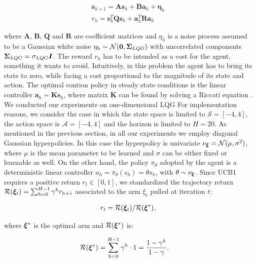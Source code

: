 \begin{align}
\boldsymbol{s}_{h+1}=\boldsymbol{A}\boldsymbol{s}_h+\boldsymbol{B}\boldsymbol{a}_h +\boldsymbol{\eta}_h\\
r_h=\boldsymbol{s}_{h}^T\boldsymbol{Q}\boldsymbol{s}_{h}+\boldsymbol{a}_{h}^T\boldsymbol{R}\boldsymbol{a}_{h}
\end{align}

where $\boldsymbol{A}$, $\boldsymbol{B}$, $\boldsymbol{Q}$ and $\boldsymbol{R}$ are coefficient matrices and $\eta_h$ is a noise process assumed to be a Gaussian white noise $\eta_h\sim\mathcal{N}(\boldsymbol{0}, \boldsymbol{\Sigma}_{LQG})$ with uncorrelated components $\boldsymbol{\Sigma}_{LQG}=\sigma_{LQG}\boldsymbol{I}$. The reward $r_h$ has to be intended as a cost for the agent, something it wants to avoid.
Intuitively, in this problem the agent has to bring its state to zero, while facing a cost proportional to the magnitude of its state and action. The optimal contion policy in steady state conditions is the linear controller $\boldsymbol{a}_{h}=\boldsymbol{K}\boldsymbol{s}_{h}$, where matrix $\boldsymbol{K}$ can be found by solving a Riccati equation \cite{dorato1995linear}. 
We conducted our experiments on one-dimensional \gls{LQG}
For implementation reasons, we consider the case in which the state space is limited to $\mathcal{S}=[-4,4]$, the action space is $\mathcal{A}=[-4,4]$ and the horizon is limited to $H=20$. As mentioned in the previous section, in all our experiments we employ diagonal Gaussian hyperpolicies. In this case the hyperpolicy is univariate $\nu_{\boldsymbol{\xi}} = \mathcal{N}(\mu, \sigma^2)$, where $\mu$ is the mean parameter to be learned and $\sigma$ can be either fixed or learnable as well. On the other hand, the policy $\pi_{\theta}$ adopted by the agent is a deterministic linear controller $a_h=\pi_{\theta}(s_h)=\theta s_h$, with $\theta\sim\nu_{\boldsymbol{\xi}}$. Since \gls{UCB}1 requires a positive return $r_t\in[0,1]$, we standardized the trajectory return $\mathcal{R}(\boldsymbol{\xi}_t)=\sum_{h=0}^{H-1}\gamma^h r_{h+1}$ associated to the arm $\xi_t$ pulled at iteration $t$: 

\begin{align}
r_t=\mathcal{R}(\boldsymbol{\xi}_t)/\mathcal{R}(\boldsymbol{\xi}^*),
\end{align}

where $\boldsymbol{\xi}^*$ is the optimal arm and $\mathcal{R}(\boldsymbol{\xi}^*)$ is:

\begin{align}
\mathcal{R}(\boldsymbol{\xi}^*)
&= \sum_{h=0}^{H-1}\gamma^h\cdot 1 = \frac{1-\gamma^h}{1-\gamma}.
\end{align}
 
